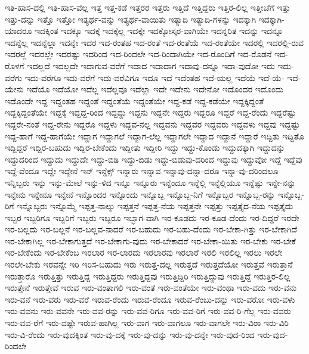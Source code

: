 {ಇತಿ-ಹಾಸ-ದಲ್ಲಿ
ಇತಿ-ಹಾಸ-ವೆಲ್ಲ
ಇತ್ತ
ಇತ್ತ-ಕಡೆ
ಇತ್ತರರ
ಇತ್ತರು
ಇತ್ತಿದೆ
ಇತ್ತಿದ್ದರು
ಇತ್ತಿರ-ಲಿಲ್ಲ
ಇತ್ತೀಚೆಗೆ
ಇತ್ತು
ಇತ್ತು-ದನ್ನು
ಇತ್ತೊ
ಇತ್ತೋ
ಇತ್ಯರ್ಥ-ವನ್ನು
ಇತ್ಯರ್ಥ-ವಾಯಿತು
ಇತ್ಯಾದಿ
ಇತ್ಯಾದಿ-ಗಳನ್ನು
ಇದಕ್ಕಾಗಿ
ಇದಕ್ಕಾಗಿ-ಯಾದರೂ
ಇದಕ್ಕಿಂತ
ಇದಕ್ಕೂ
ಇದಕ್ಕೆ
ಇದಕ್ಕೆಲ್ಲ
ಇದಕ್ಕೇ
ಇದಕ್ಕೋಸ್ಕರ-ವಾಗಿಯೇ
ಇದನ್ನರಿತ
ಇದನ್ನು
ಇದನ್ನೂ
ಇದನ್ನೆಲ್ಲ
ಇದನ್ನೆಲ್ಲಾ
ಇದನ್ನೇ
ಇದರ
ಇದ-ರಂತಹ
ಇದ-ರಂತೆ
ಇದ-ರಂತೆಯೆ
ಇದ-ರಂತೆಯೇ
ಇದರಲ್ಲಿ
ಇದರಲ್ಲಿ-ರುವ
ಇದರಲ್ಲೆ
ಇದರಲ್ಲೇ
ಇದರಷ್ಟು
ಇದರಿಂದ
ಇದ-ರಿಂದಲೇ
ಇದ-ರಿಂದಾಗಿಯೇ
ಇದ-ರೊಂದಿಗೆ
ಇದ-ರೊಡನೆ
ಇದ-ರೊಳಗೆ
ಇದಲ್ಲದೆ
ಇದಲ್ಲದೇ
ಇದಾಗುವ-ವರೆಗೆ
ಇದಾದ
ಇದಾದಾಗ
ಇದಾವು-ದನ್ನೂ
ಇದಾ-ವುದೋ
ಇದು
ಇದು-ವರೆಗು
ಇದು-ವರೆಗೂ
ಇದು-ವರೆಗೆ
ಇದು-ವರೆವಿಗೂ
ಇದೂ
ಇದೆ
ಇದೆಂತಹ
ಇದೆ-ಯಲ್ಲ
ಇದೆಯೆ
ಇದೆ-ಯೆ-
ಇದೆ-ಯೇನು
ಇದೆಯೊ
ಇದೆಯೋ
ಇದೆಲ್ಲ
ಇದೆಲ್ಲವೂ
ಇದೆಲ್ಲಾ
ಇದೇ
ಇದೇನು
ಇದೇನೋ
ಇದೊಂದರ
ಇದೊಂದು
ಇದೊಂದೇ
ಇದ್ದ
ಇದ್ದಂತಹ
ಇದ್ದಂತೆ
ಇದ್ದಂತೆಯೆ
ಇದ್ದಂತೆಯೇ
ಇದ್ದ-ಕಡೆ
ಇದ್ದ-ಕಡೆಯೇ
ಇದ್ದಕ್ಕಿದ್ದಂತೆ
ಇದ್ದಕ್ಕಿದ್ದಂತೆಯೇ
ಇದ್ದಕ್ಕೆ
ಇದ್ದದ್ದ-ರಿಂದ
ಇದ್ದದ್ದು
ಇದ್ದನು
ಇದ್ದನೇ
ಇದ್ದರು
ಇದ್ದರೂ
ಇದ್ದರೆ
ಇದ್ದ-ರೆಂದು
ಇದ್ದರೆಷ್ಟು
ಇದ್ದರೇ-ನಂತೆ
ಇದ್ದ-ರೇನು
ಇದ್ದರೊ
ಇದ್ದಳು
ಇದ್ದವ-ನಲ್ಲ
ಇದ್ದವನು
ಇದ್ದವರ
ಇದ್ದವರು
ಇದ್ದವಳು
ಇದ್ದವು
ಇದ್ದಷ್ಟು
ಇದ್ದ-ಹಾಗೆ
ಇದ್ದ-ಹಾಗೆಯೇ
ಇದ್ದಾಗ
ಇದ್ದಾಗಲೆ
ಇದ್ದಾಗ-ಲೆಲ್ಲ
ಇದ್ದಾಗಲೇ
ಇದ್ದಾದ
ಇದ್ದಾನೆ
ಇದ್ದಾರೆ
ಇದ್ದಿತು
ಇದ್ದಿತೊ
ಇದ್ದಿದ್ದರೆ
ಇದ್ದಿರ-ಬಹುದು
ಇದ್ದಿರ-ಬೇಕೆಂದು
ಇದ್ದೀತು
ಇದ್ದೀರಿ
ಇದ್ದು
ಇದ್ದು-ಕೊಂಡು
ಇದ್ದುದಕ್ಕಾಗಿ
ಇದ್ದುದನ್ನು
ಇದ್ದುದರಿಂದ
ಇದ್ದುದು
ಇದ್ದುದೇ
ಇದ್ದು-ಬಿಡಿ
ಇದ್ದು-ಬಿಡು
ಇದ್ದು-ಬಿಡುವು-ದರಿಂದ
ಇದ್ದುವು
ಇದ್ದುವೋ
ಇದ್ದೆ
ಇದ್ದೆವು
ಇದ್ದೆ-ವೆಂದೂ
ಇದ್ದೇ
ಇದ್ದೇನೆ
ಇನ್
ಇನ್ಡೆಕ್ಸ್
ಇನ್ನಾರು
ಇನ್ನಾವ
ಇನ್ನಾವು-ದನ್ನಾ-ದರೂ
ಇನ್ನಾ-ವು-ದರಿಂದಲೂ
ಇನ್ನಿಬ್ಬರು
ಇನ್ನು
ಇನ್ನು-ಮೇಲೆ
ಇನ್ನು-ಳಿದ
ಇನ್ನೂ
ಇನ್ನೂರು
ಇನ್ನೆಂದೂ
ಇನ್ನೆಲ್ಲಿ
ಇನ್ನೆಲ್ಲಿಯೂ
ಇನ್ನೆಷ್ಟು
ಇನ್ನೇ-ನನ್ನು
ಇನ್ನೇನು
ಇನ್ನೇನೂ
ಇನ್ನೇನೆ
ಇನ್ನೊಂದರ
ಇನ್ನೊಂದು
ಇನ್ನೊಬ್ಬ
ಇನ್ನೊಬ್ಬ-ನಿಗೆ
ಇನ್ನೊಬ್ಬರ
ಇನ್ನೊಬ್ಬ-ರನ್ನು
ಇನ್ನೊಬ್ಬ-ರಿಗೆ
ಇನ್ನೊಬ್ಬರು
ಇನ್ನೊಮ್ಮೆ
ಇಪ್ಪತ್ತ-ನಾಲ್ಕು
ಇಪ್ಪತ್ತನೆ
ಇಪ್ಪತ್ತ-ನೆಯ
ಇಪ್ಪತ್ತನೇ
ಇಪ್ಪತ್ತು
ಇಪ್ಪತ್ತೈದ-ನೆಯ
ಇಪ್ಪತ್ತೈದು
ಇಬ್ಬರ
ಇಬ್ಬರಿಗೂ
ಇಬ್ಬರಿಗೆ
ಇಬ್ಬರು
ಇಬ್ಬರೂ
ಇಬ್ಭಾಗ-ವಾಗಿ
ಇರ-ಕೂಡದು
ಇರ-ಕೂಡ-ದೆಂದು
ಇರ-ದಿದ್ದರೆ
ಇರದೇ
ಇರ-ಬಲ್ಲದು
ಇರ-ಬಲ್ಲನೆ
ಇರ-ಬಲ್ಲವ-ನಾದರೆ
ಇರ-ಬಹುದು
ಇರ-ಬಹು-ದೆಂದು
ಇರ-ಬೇಕಾ-ಗಿತ್ತು
ಇರ-ಬೇಕಾಗಿದೆ
ಇರ-ಬೇಕಾಗಿಲ್ಲ
ಇರ-ಬೇಕಾಗುತ್ತದೆ
ಇರ-ಬೇಕಾಗು-ವುದು
ಇರ-ಬೇಕಾದರೆ
ಇರ-ಬೇಕಾ-ಯಿತು
ಇರ-ಬೇಕು
ಇರ-ಬೇಕೆ
ಇರ-ಬೇಕೆಂದು
ಇರ-ಬೇಕೆಂಬ
ಇರಲಾರ
ಇರ-ಲಾರದು
ಇರಲಾರವು
ಇರಲಾರೆ
ಇರಲಿ
ಇರಲಿಲ್ಲ
ಇರಲು
ಇರಲೇ
ಇರಲೇ-ಬೇಕು
ಇರವನ್ನೇ
ಇರಿ
ಇರಿಸ-ಬಹುದು
ಇರು
ಇರುತ್ತ-ದಲ್ಲ
ಇರುತ್ತದೆ
ಇರುತ್ತದೆಯೋ
ಇರುತ್ತವೆ
ಇರುತ್ತಾನೆ
ಇರುತ್ತಾರೊ
ಇರುತ್ತಿತ್ತು
ಇರುತ್ತಿದ್ದ
ಇರುತ್ತಿದ್ದರು
ಇರುತ್ತಿದ್ದವು
ಇರುತ್ತಿದ್ದಿರಿ
ಇರುತ್ತಿದ್ದುವು
ಇರುತ್ತಿದ್ದೆ
ಇರುತ್ತಿರ-ಲಿಲ್ಲ
ಇರುತ್ತೇನೆ
ಇರುತ್ತೇವೆ
ಇರುವ
ಇರು-ವಂತಾಗಲಿ
ಇರು-ವಂತೆ
ಇರು-ವಂತೆಯೇ
ಇರು-ವಂಥಾ
ಇರು-ವದು
ಇರು-ವನು
ಇರು-ವನೆ
ಇರು-ವರು
ಇರು-ವರೆ
ಇರುವ-ರೆಂದು
ಇರುವ-ರೆಂದೂ
ಇರುವ-ರೆಂಬು-ದನ್ನು
ಇರು-ವರೋ
ಇರು-ವಳು
ಇರು-ವವನು
ಇರು-ವವನೇ
ಇರು-ವವ-ರನ್ನು
ಇರು-ವವ-ರಿಗೂ
ಇರು-ವವ-ರಿಗೆ
ಇರು-ವವ-ರಿ-ಗೆಲ್ಲ
ಇರು-ವವರು
ಇರು-ವವ-ರೆಗೆ
ಇರು-ವಷ್ಟೇ
ಇರುವ-ಹಾಗಿಲ್ಲ
ಇರು-ವಾಗ
ಇರು-ವಾಗಲೂ
ಇರು-ವಾಗಲೇ
ಇರು-ವಿರಾ
ಇರು-ವಿರಿ
ಇರು-ವಿ-ರೆಂದು
ಇರು-ವುದಕ್ಕಿಂತ
ಇರು-ವು-ದಕ್ಕೆ
ಇರು-ವು-ದನ್ನು
ಇರು-ವು-ದನ್ನೇ
ಇರು-ವುದ-ರಿಂದ
ಇರು-ವುದ-ರಿಂದಲೇ
}
